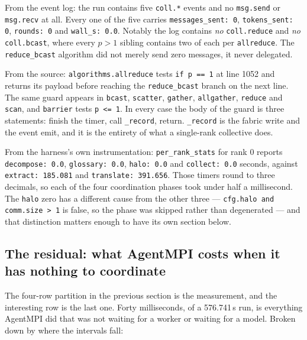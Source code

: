 \documentclass[11pt]{article}
\begin{document}
From the event log: the run contains five \texttt{coll.*} events and no \texttt{msg.send} or
\texttt{msg.recv} at all. Every one of the five carries \texttt{messages\_sent: 0},
\texttt{tokens\_sent: 0}, \texttt{rounds: 0} and \texttt{wall\_s: 0.0}. Notably the log contains
\emph{no} \texttt{coll.reduce} and \emph{no} \texttt{coll.bcast}, where every $p>1$ sibling
contains two of each per \texttt{allreduce}. The \texttt{reduce\_bcast} algorithm did not merely
send zero messages, it never delegated.

From the source: \texttt{algorithms.allreduce} tests \texttt{if p == 1} at line 1052 and returns
its payload before reaching the \texttt{reduce\_bcast} branch on the next line. The same guard
appears in \texttt{bcast}, \texttt{scatter}, \texttt{gather}, \texttt{allgather}, \texttt{reduce}
and \texttt{scan}, and \texttt{barrier} tests \texttt{p <= 1}. In every case the body of the guard
is three statements: finish the timer, call \texttt{\_record}, return. \texttt{\_record} is the
fabric write and the event emit, and it is the entirety of what a single-rank collective does.

From the harness's own instrumentation: \texttt{per\_rank\_stats} for rank 0 reports
\texttt{decompose: 0.0}, \texttt{glossary: 0.0}, \texttt{halo: 0.0} and \texttt{collect: 0.0}
seconds, against \texttt{extract: 185.081} and \texttt{translate: 391.656}. Those timers round to
three decimals, so each of the four coordination phases took under half a millisecond. The
\texttt{halo} zero has a different cause from the other three --- \texttt{cfg.halo and comm.size
> 1} is false, so the phase was skipped rather than degenerated --- and that distinction matters
enough to have its own section below.

\subsection*{The residual: what AgentMPI costs when it has nothing to coordinate}

The four-row partition in the previous section is the measurement, and the interesting row is the
last one. Forty milliseconds, of a 576.741\,s run, is everything AgentMPI did that was not waiting
for a worker or waiting for a model. Broken down by where the intervals fall:
\end{document}
